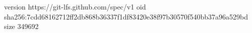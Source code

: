 version https://git-lfs.github.com/spec/v1
oid sha256:7cdd68162712ff2db868b36337f1df83420e38f97b30570f540bb37a96a529bd
size 349692
